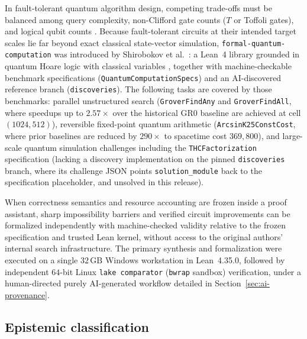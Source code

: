 \documentclass[11pt,a4paper]{article}
\theoremstyle{definition}
\theoremstyle{remark}
\begin{document}
In fault-tolerant quantum algorithm design, competing trade-offs must be balanced among query complexity, non-Clifford gate counts (\(T\) or Toffoli gates), and logical qubit counts \cite{grover1996,bbht1998,zalka1999,grover2004,haner2018,jones2013,gidney2018,lee2021}. Because fault-tolerant circuits at their intended target scales lie far beyond exact classical state-vector simulation, \texttt{formal-quantum-\allowbreak computation} was introduced by Shirobokov et al.\ \cite{shirobokov2026}: a Lean~4 library grounded in quantum Hoare logic with classical variables \cite{feng2021,demoura2021,mathlib2020,physlib2024}, together with machine-checkable benchmark specifications (\texttt{Quantum\allowbreak Computation\allowbreak Specs}) and an AI-discovered reference branch (\texttt{discoveries}). The following tasks are covered by those benchmarks: parallel unstructured search (\texttt{GroverFindAny} and \texttt{GroverFindAll}, where speedups up to \(2.57\times\) over the historical \textrm{GR0} baseline are achieved at cell \((1024,512)\)), reversible fixed-point quantum arithmetic (\texttt{ArcsinK25\allowbreak ConstCost}, where prior baselines are reduced by \(290\times\) to spacetime cost \(369{,}800\)), and large-scale quantum simulation challenges including the \texttt{THC\allowbreak Factorization} specification (lacking a discovery implementation on the pinned \texttt{discoveries} branch, where its challenge JSON points \texttt{solution\_module} back to the specification placeholder, and unsolved in this release).

When correctness semantics and resource accounting are frozen inside a proof assistant, sharp impossibility barriers and verified circuit improvements can be formalized independently with machine-checked validity relative to the frozen specification and trusted Lean kernel, without access to the original authors' internal search infrastructure. The primary synthesis and formalization were executed on a single \(32\,\mathrm{GB}\) Windows workstation in Lean~4.35.0, followed by independent \(64\)-bit Linux \texttt{lake comparator} (\texttt{bwrap} sandbox) verification, under a human-directed purely AI-generated workflow detailed in Section~\ref{sec:ai-provenance}.

\subsection{Epistemic classification}
\label{sec:epistemic}
\end{document}
